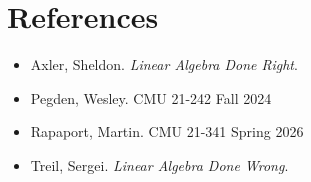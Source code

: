 \chapter{References}
\begin{itemize}
    \item Axler, Sheldon. \textit{Linear Algebra Done Right}.
    \item Pegden, Wesley. CMU 21-242 Fall 2024
    \item Rapaport, Martin. CMU 21-341 Spring 2026
    \item Treil, Sergei. \textit{Linear Algebra Done Wrong}.
\end{itemize}